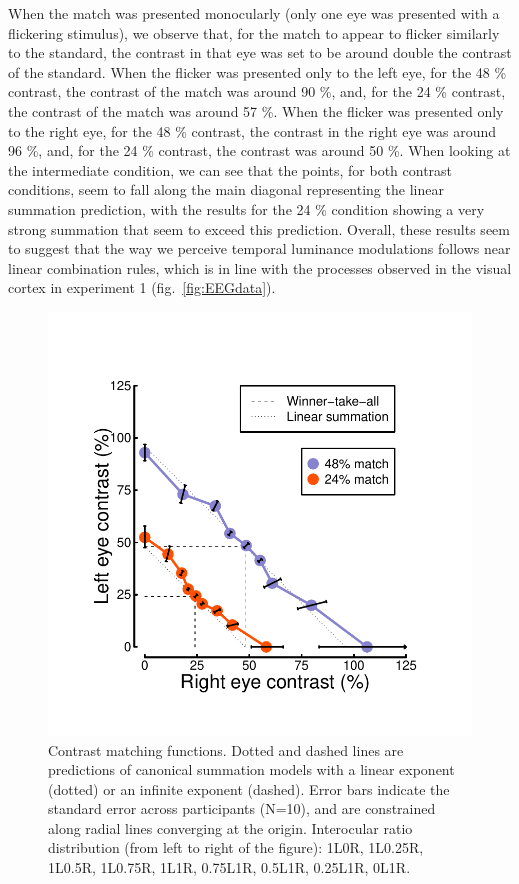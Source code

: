 \documentclass[
]{article}
\begin{document}
When the match was presented monocularly (only one eye was presented with a flickering stimulus), we observe that, for the match to appear to flicker similarly to the standard, the contrast in that eye was set to be around double the contrast of the standard. When the flicker was presented only to the left eye, for the 48 \% contrast, the contrast of the match was around 90 \%, and, for the 24 \% contrast, the contrast of the match was around 57 \%. When the flicker was presented only to the right eye, for the 48 \% contrast, the contrast in the right eye was around 96 \%, and, for the 24 \% contrast, the contrast was around 50 \%. When looking at the intermediate condition, we can see that the points, for both contrast conditions, seem to fall along the main diagonal representing the linear summation prediction, with the results for the 24 \% condition showing a very strong summation that seem to exceed this prediction. Overall, these results seem to suggest that the way we perceive temporal luminance modulations follows near linear combination rules, which is in line with the processes observed in the visual cortex in experiment 1 (fig.~\ref{fig:EEGdata}).

\begin{figure}

{\centering \includegraphics{Figures/matchingdata} 

}

\caption{Contrast matching functions. Dotted and dashed lines are predictions of canonical summation models with a linear exponent (dotted) or an infinite exponent (dashed). Error bars indicate the standard error across participants (N=10), and are constrained along radial lines converging at the origin. Interocular ratio distribution (from left to right of the figure): 1L0R, 1L0.25R, 1L0.5R, 1L0.75R, 1L1R, 0.75L1R, 0.5L1R, 0.25L1R, 0L1R.}\label{fig:matchingdata}
\end{figure}
\end{document}
